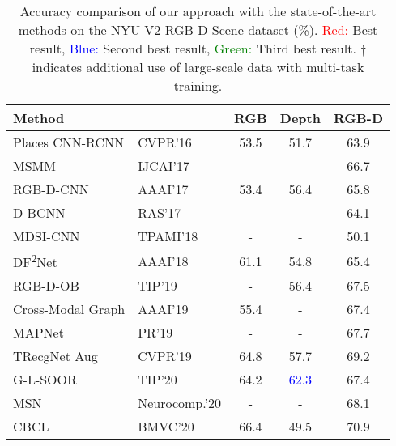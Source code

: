 \begin{table}[!h]
	\caption{Accuracy comparison of our approach with the state-of-the-art methods on the NYU V2 RGB-D Scene dataset (\%). \textcolor{red}{Red:} Best result, \textcolor{blue}{Blue:} Second best result, \textcolor{green}{Green:} Third best result. $\dagger$ indicates additional use of large-scale data with multi-task training.}
	\begin{center}
		\setlength{\tabcolsep}{0.9em} %
		\def\arraystretch{1.2}
		\begin{adjustbox}{width=\columnwidth}
			\begin{tabular}{ llccc }
				\hline
				Method 												&				& RGB 				& Depth 			& RGB-D \\ \hline \hline
				Places CNN-RCNN \citep{2016_CVPR_Wang}         		& CVPR'16		& 53.5 				& 51.7 	 			& 63.9	\\
				MSMM \citep{2017_IJCAI_Song}         				& IJCAI'17		& - 	           	& - 	        	& 66.7 	\\
				RGB-D-CNN \citep{2017_AAAI_Song}         			& AAAI'17		& 53.4 	           	& 56.4 	        	& 65.8 	\\
				D-BCNN \citep{2017_RAS_Zaki}         				& RAS'17		& - 	           	& - 	        	& 64.1 	\\
				MDSI-CNN \citep{2018_TPAMI_Asif}         			& TPAMI'18		& -	           		& - 	        	& 50.1 	\\
				DF\textsuperscript{2}Net \citep{2018_AAAI_Li} 		& AAAI'18		& 61.1 	           	& 54.8 	        	& 65.4  \\
				RGB-D-OB \citep{2019_TIP_Song}         				& TIP'19		& - 	           	& 56.4 	        	& 67.5 	\\
				Cross-Modal Graph \citep{2019_AAAI_Yuan}        	& AAAI'19		& 55.4 	           	& - 	        	& 67.4	\\
				MAPNet \citep{2019_PR_Li} 							& PR'19			& - 	           	& - 	        	& 67.7 	\\
				TRecgNet Aug \citep{2019_CVPR_Du}         			& CVPR'19		& 64.8 				& 57.7 				& 69.2 	\\
				G-L-SOOR \citep{2020_TIP_Song}         				& TIP'20		& 64.2 	           	& \bftab\textcolor{blue}{62.3} 	        	& 67.4	\\
				MSN \citep{2020_Neuroc_Xiong}         				& Neurocomp.'20	& - 	           	& - 	        	& 68.1	\\
				CBCL \citep{2020_BMVC_Ayub}         				& BMVC'20		& 66.4 				& 49.5 	        	& 70.9 	\\ 

\end{tabular}
\end{adjustbox}
\end{center}
\end{table}
